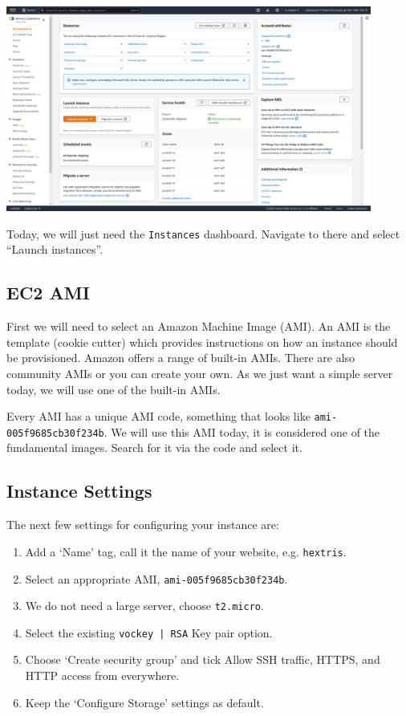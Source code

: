 \documentclass{csse4400}
\begin{document}
\vspace{3mm}
\includegraphics[width=0.9\textwidth]{images/ec2-interface}
\vspace{3mm}

Today, we will just need the \texttt{Instances} dashboard.
Navigate to there and select ``Launch instances''.

\subsection{EC2 AMI}
First we will need to select an Amazon Machine Image (AMI).
An AMI is the template (cookie cutter) which provides instructions on how an instance should be provisioned.
Amazon offers a range of built-in AMIs. There are also community AMIs or you can create your own.
As we just want a simple server today, we will use one of the built-in AMIs.

Every AMI has a unique AMI code,
something that looks like \texttt{ami-005f9685cb30f234b}.
We will use this AMI today,
it is considered one of the fundamental images.
Search for it via the code and select it.


\subsection{Instance Settings}
The next few settings for configuring your instance are:
\begin{enumerate}
\item Add a `Name' tag, call it the name of your website, e.g. \texttt{hextris}.
\item Select an appropriate AMI, \texttt{ami-005f9685cb30f234b}.
\item We do not need a large server, choose \texttt{t2.micro}.
\item Select the existing \texttt{vockey | RSA} Key pair option.
\item Choose `Create security group' and tick Allow SSH traffic, HTTPS, and HTTP access from everywhere.
\item Keep the `Configure Storage' settings as default.
\end{enumerate}
\end{document}

